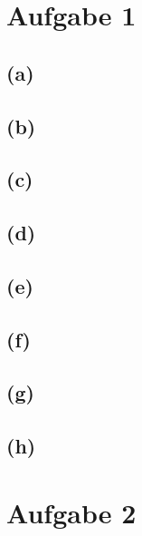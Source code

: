 \documentclass[titlepage]{article}
\renewcommand{\]}{\right]}
\renewcommand{\[}{\left[}
\renewcommand{\)}{\right)}
\renewcommand{\(}{\left(}
\renewcommand{\|}{\;|\;}
\begin{document}
\begingroup\let\clearpage\relax
	
	
	\section*{Aufgabe 1}
		\subsection*{(a)}
			
		\subsection*{(b)}
			
		\subsection*{(c)}
			
		\subsection*{(d)}
			
		\subsection*{(e)}
			
		\subsection*{(f)}
			
		\subsection*{(g)}
			
		\subsection*{(h)}
			
		
	\section*{Aufgabe 2}
		
	
\endgroup
\end{document}
